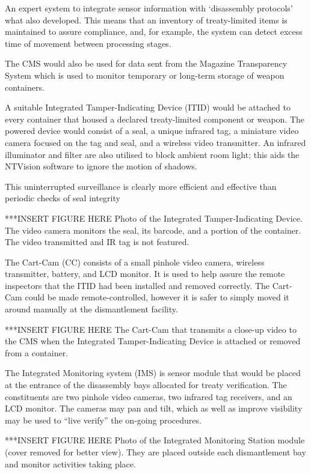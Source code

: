 \documentclass[twoside,titlepage,11pt,twocolumn,a4paper]{article}
\begin{document}
An expert system to integrate sensor information with `disassembly 
protocols' what also developed. This means that an inventory of 
treaty-limited items is maintained to assure compliance, and, for 
example, the system can detect excess time of movement between 
processing stages.

The CMS would also be used for data sent from the Magazine 
Transparency System which is used to monitor temporary or 
long-term storage of weapon containers.

A suitable Integrated Tamper-Indicating Device (ITID) would be 
attached to every container that housed a declared treaty-limited 
component or weapon. The powered device would consist of a seal, 
a unique infrared tag, a miniature video camera focused on the tag 
and seal, and a wireless video transmitter. An infrared illuminator 
and filter are also utilised to block ambient room light; this aids 
the NTVision software to ignore the motion of shadows.

This uninterrupted surveillance is clearly more efficient and 
effective than periodic checks of seal integrity

***INSERT FIGURE HERE Photo of the Integrated Tamper-Indicating 
Device. The video camera monitors the seal, its barcode, and a 
portion of the container. The video transmitted and IR tag is not 
featured. \citep{gerdes2001}

The Cart-Cam (CC) consists of a small pinhole video camera, 
wireless transmitter, battery, and LCD monitor. It is used to 
help assure the remote inspectors that the ITID had been 
installed and removed correctly. The Cart-Cam could be made 
remote-controlled, however it is safer to simply moved it 
around manually at the dismantlement facility.

***INSERT FIGURE HERE The Cart-Cam that transmits a close-up video 
to the CMS when the Integrated Tamper-Indicating Device is attached 
or removed from a container. \citep{gerdes2001}

The Integrated Monitoring system (IMS) is sensor module that would 
be placed at the entrance of the disassembly bays allocated for 
treaty verification. The constituents are two pinhole video cameras, 
two infrared tag receivers, and an LCD monitor. The cameras may pan 
and tilt, which as well as improve visibility may be used to 
``live verify'' the on-going procedures. 

***INSERT FIGURE HERE Photo of the Integrated Monitoring Station 
module (cover removed for better view). They are placed outside 
each dismantlement bay and monitor activities taking place. \citep{gerdes2001}
\end{document}
